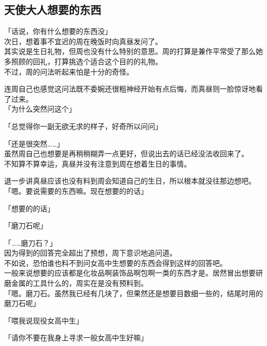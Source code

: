 \subsection{天使大人想要的东西}

「话说，你有什么想要的东西没」\\

次日，想着事不宜迟的周在晚饭时向真昼发问了。\\

其实说是生日礼物，但周也没有什么特别的意思。周的打算是兼作平常受了那么她多照顾的回礼，打算挑选个适合这个目的的礼物。\\

不过，周的问法听起来怕是十分的奇怪。

连周自己也感觉这问法既不委婉还很粗神经开始有点后悔，而真昼则一脸惊讶地看了过来。\\

「为什么突然问这个」

「总觉得你一副无欲无求的样子，好奇所以问问」

「还是很突然……」\\

虽然周自己也想要是再稍稍糊弄一点更好，但说出去的话已经没法收回来了。\\

不知算不算幸运，真昼并没有注意到周在想着生日的事情。

退一步讲真昼应该也没有料到周会知道自己的生日，所以根本就没往那边想吧。\\

「嗯。要说需要的东西嘛。现在想要的的话」

「想要的的话」

「磨刀石呢」

「……磨刀石？」\\

因为得到的回答完全超出了预想，周下意识地追问道。\\

不如说，恐怕谁也料不到问女高中生想要的东西会得到这样的回答吧。\\

一般来说想要的应该都是化妆品啊装饰品啊包啊一类的东西才是。居然冒出想要研磨金属的工具什么的，周实在是没有预料到。\\

「嗯。磨刀石。虽然我已经有几块了，但果然还是想要目数细一些的，结尾时用的磨刀石呢」

「喂我说现役女高中生」

「请你不要在我身上寻求一般女高中生好嘛」\\

